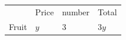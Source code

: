{\begin{mdframed}[linewidth=4, leftmargin=40, rightmargin=40]
\begin{exercise}
\begin{enumerate}[noitemsep, label=\textbf{Step} \textbf{\arabic*}. ]
{\begin{tabular}[t]{|l|l|l|l|}
    
         &
    
    
        Price &
    
    
        number &
    
    
        Total%
     \tabularnewline\cline{1-1}\cline{2-2}\cline{3-3}\cline{4-4}
    
    
        Fruit &
    
    
        
                  \begin{math}y\end{math}
                 &
    
    
        3 &
    
    
        
                  \begin{math}3y\end{math}
     \tabularnewline\cline{1-1}\cline{2-2}\cline{3-3}\cline{4-4}
    

\end{tabular}}
\end{enumerate}
\end{exercise}
\end{mdframed}}
